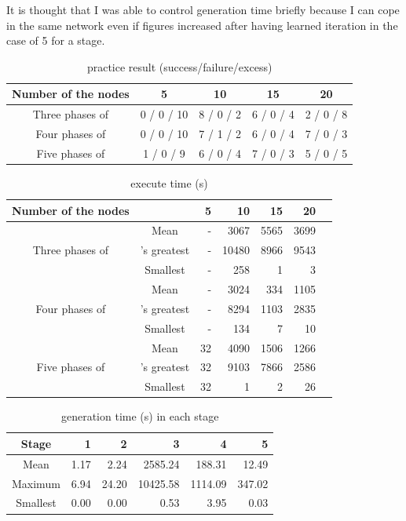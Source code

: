 \documentclass{article}
\begin{document}
It is thought that I was able to control generation time briefly because I can cope in the same network even if figures increased after having learned iteration in the case of 5 for a stage.
\begin{table}[htbp]
\caption {practice result (success/failure/excess)}
\label{tbl:result1}
\begin{tabular}{c|cccc}
Number of the nodes &
5&
10&
15&
20\\
\hline \hline
Three phases of &
0 / 0 / 10&
8 / 0 / 2&
6 / 0 / 4&
2 / 0 / 8\\
Four phases of &
0 / 0 / 10&
7 / 1 / 2&
6 / 0 / 4&
7 / 0 / 3\\
Five phases of &
1 / 0 / 9&
6 / 0 / 4&
7 / 0 / 3&
5 / 0 / 5\\
\hline
\end{tabular}
\end{table}
\begin{table}[htbp]
\caption {execute time (s)}
\label{tbl:result2}
\begin{tabular}{c|crrrrr}
Number of the nodes & & 5&
10& 15&
20\\
\hline \hline
&
Mean & -& 3067& 5565& 3699\\
Three phases of &'s greatest & -& 10480& 8966& 9543\\
&
Smallest & -& 258&
1&
3\\
\hline
&
Mean & -& 3024& 334& 1105\\
Four phases of &'s greatest & -& 8294& 1103& 2835\\
&
Smallest & -& 134&
7&
10\\
\hline
&
Mean & 32& 4090& 1506& 1266\\
Five phases of &'s greatest & 32& 9103& 7866& 2586\\
&
Smallest & 32&
1&
2& 26\\
\hline
\end{tabular}
\end{table}
\begin{table}[htbp]
\caption {generation time (s) in each stage}
\label{tbl:result3}
\begin{tabular}{c|rrrrr}
Stage &
1&
2&
3&
4&
5\\
\hline
\hline
Mean &
1.17&
2.24&
2585.24&
188.31&
12.49\\
Maximum &
6.94&
24.20&
10425.58&
1114.09&
347.02\\
Smallest &
0.00&
0.00&
0.53&
3.95&
0.03\\
\hline
\end{tabular}
\end{table}
\end{document}
